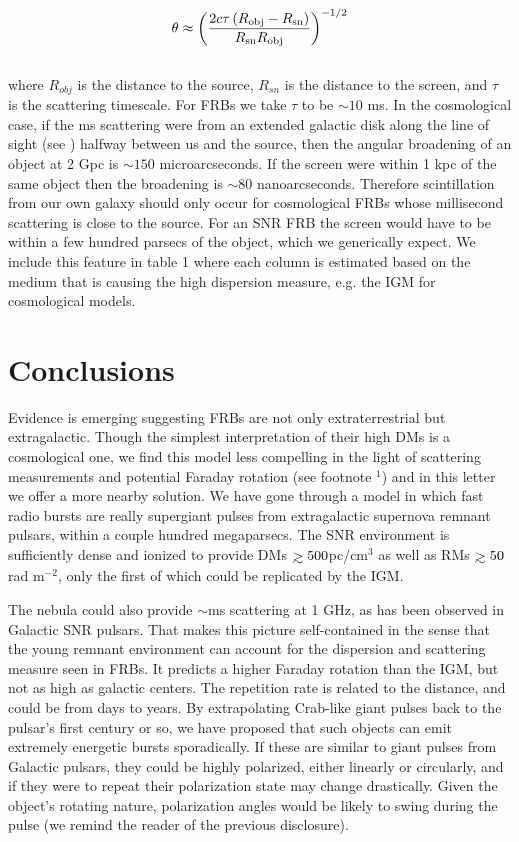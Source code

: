 \documentclass[useAMS,usenatbib]{mn2e}
\def\gtrsim{\mathrel{\hbox{\rlap{\hbox{\lower4pt\hbox{$\sim$}}}\hbox{$>$}}}}
\begin{document}
\begin{equation}
\label{eqn-scint}
\theta \approx \left ( \frac{2 c \tau \, (R_{\rm obj} - R_{\rm sn})}{R_{\rm sn}R_{\rm obj}} \right )^{-1/2}
\end{equation}
\\

\noindent where $R_{obj}$ is the distance to the source, $R_{sn}$ is the distance 
to the screen, and $\tau$ is the scattering timescale. For FRBs we 
take $\tau$ to be $\sim10$ ms. In the cosmological case, if the ms scattering
were from an extended galactic disk along the line of sight  (see \citet{2014ApJ...780L..33M})
halfway between
us and the source, then the angular broadening
of an object at 2 Gpc is $\sim150$ microarcseconds. If the screen were within 
1 kpc of the same object then the broadening is $\sim80$ nanoarcseconds. 
Therefore scintillation from our own galaxy should only occur for cosmological 
FRBs whose millisecond scattering is close to the source. For an SNR FRB the 
screen would have to be within a few hundred parsecs of the object, which we 
generically expect. We include this feature in table 1 where each 
column is estimated based on the medium that is causing the high dispersion measure, 
e.g. the IGM for cosmological models.


\section{Conclusions}
Evidence is emerging suggesting FRBs are not only extraterrestrial
but extragalactic. Though the simplest interpretation of their high DMs 
is a cosmological one, we find this model less compelling in the light of 
scattering measurements and potential Faraday rotation (see footnote $^1$)
and in this letter we offer a 
more nearby solution. 
We have gone through
a model in which fast radio bursts are really supergiant pulses from 
extragalactic supernova remnant pulsars, within a couple hundred megaparsecs. 
The SNR environment is sufficiently
dense and ionized to provide DMs $\gtrsim 500$pc/cm$^3$ as well as 
RMs $\gtrsim 50$ rad m$^{-2}$, only the first of which could be replicated by the IGM. 

The nebula could also provide $\sim$ms scattering at 1 GHz, as has been 
observed in Galactic SNR pulsars. 
That makes this picture self-contained in the sense that
the young remnant environment can account for the dispersion 
and scattering measure seen in FRBs.  It predicts a higher Faraday
rotation than the IGM, but not as high as galactic centers.  The
repetition rate is related to the distance, and could be from days to
years.  
By extrapolating Crab-like giant pulses back to the pulsar's first century or so,
we have proposed that such objects can emit extremely energetic bursts sporadically. 
If these are similar to giant pulses from Galactic pulsars, they could be highly polarized, 
either linearly or circularly, and if they were to repeat their polarization state may 
change drastically. Given the object's rotating nature, polarization
 angles would be likely to swing during the pulse (we
remind the reader of the previous disclosure).
\\
\end{document}
